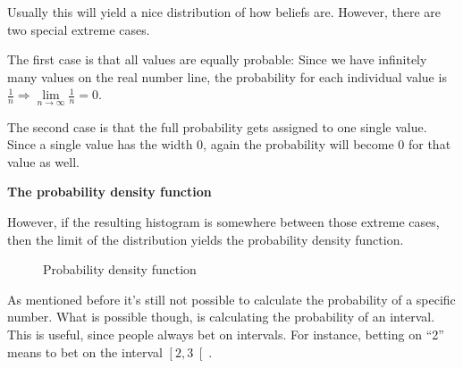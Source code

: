 Usually this will yield a nice distribution of how beliefs are. However, there are two special extreme cases.

\vspace{1em}

The first case is that all values are equally probable: Since we have infinitely many values on the real number line, the probability for each individual value is $\frac{1}{n} \Rightarrow \lim\limits_{n\rightarrow\infty} \frac{1}{n} = 0$. 

\vspace{1em}

The second case is that the full probability gets assigned to one single value. Since a single value has the width 0, again the probability will become 0 for that value as well.

\newpage
\textbf{The probability density function}

However, if the resulting histogram is somewhere between those extreme cases, then the limit of the distribution yields the probability density function.

\begin{figure}[h]
\centering
{}
\caption{Probability density function}
\end{figure}

As mentioned before it's still not possible to calculate the probability of a specific number. What is possible though, is calculating the probability of an interval. This is useful, since people always bet on intervals. For instance, betting on ``2'' means to bet on the interval $\left[2,3\right[$.

